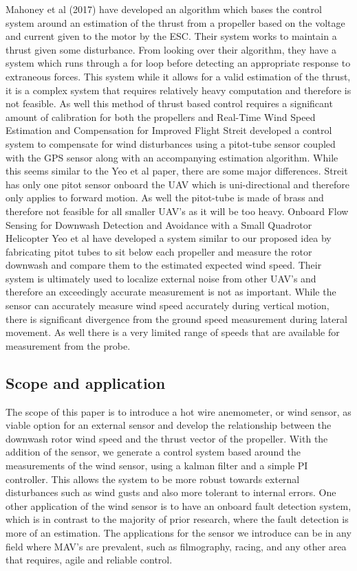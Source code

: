 \documentclass[conference]{IEEEtran}
\begin{document}
	Mahoney et al (2017) have developed an algorithm which bases the control system around an estimation of the thrust from a propeller based on the voltage and current given to the motor by the ESC. Their system works to maintain a thrust given some disturbance. From looking over their algorithm, they have a system which runs through a for loop before detecting an appropriate response to extraneous forces. This system while it allows for a valid estimation of the thrust, it is a complex system that requires relatively heavy computation and therefore is not feasible. As well this method of thrust based control requires a significant amount of calibration for both the propellers and 
	Real-Time Wind Speed Estimation and Compensation for Improved Flight
	Streit developed a control system to compensate for wind disturbances using a pitot-tube sensor coupled with the GPS sensor along with an accompanying estimation algorithm. While this seems similar to the Yeo et al paper, there are some major differences. Streit has only one pitot sensor onboard the UAV which is uni-directional and therefore only applies to forward motion. As well the pitot-tube is made of brass and therefore not feasible for all smaller UAV's as it will be too heavy. 
	Onboard Flow Sensing for Downwash Detection and Avoidance with a Small Quadrotor Helicopter
	Yeo et al have developed a system similar to our proposed idea by fabricating pitot tubes to sit below each propeller and measure the rotor downwash and compare them to the estimated expected wind speed. Their system is ultimately used to localize external noise from other UAV's and therefore an exceedingly accurate measurement is not as important. While the sensor can accurately measure wind speed accurately during vertical motion, there is significant divergence from the ground speed measurement during lateral movement. As well there is a very limited range of speeds that are available for measurement from the probe. 
	\subsection{Scope and application}
	The scope of this paper is to introduce a hot wire anemometer, or wind sensor, as viable option for an external sensor and develop the relationship between the downwash rotor wind speed and the thrust vector of the propeller. With the addition of the sensor, we generate a control system based around the measurements of the wind sensor, using a kalman filter and a simple PI controller. This allows the system to be more robust towards external disturbances such as wind gusts and also more tolerant to internal errors. One other application of the wind sensor is to have an onboard fault detection system, which is in contrast to the majority of prior research, where the fault detection is more of an estimation. The applications for the sensor we introduce can be in any field where MAV's are prevalent, such as filmography, racing, and any other area that requires, agile and reliable control. 
\end{document}
